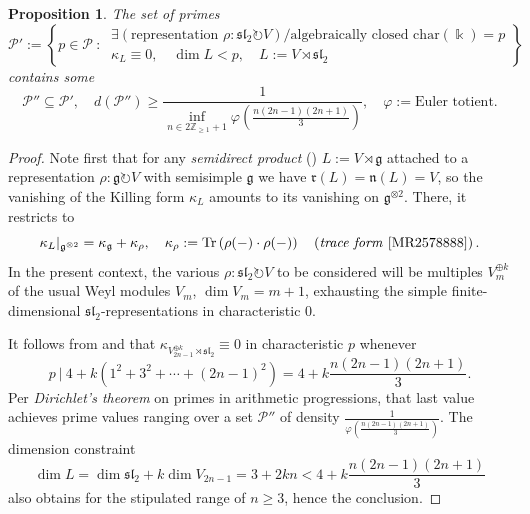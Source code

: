 \documentclass[11pt,leqno]{article}
\theoremstyle{plain}
\newtheorem{proposition}[lemma]{Proposition}
\theoremstyle{plain}
\theoremstyle{plain}
\numberwithin{equation}{section}
\theoremstyle{nonumberplain}
\newtheorem{proof}{Proof}
\newcommand\bZ{{\mathbb Z}}
\newcommand\cP{{\mathcal P}}
\newcommand\fg{{\mathfrak g}}
\newcommand\fn{{\mathfrak n}}
\newcommand\fr{{\mathfrak r}}
\newcommand\fsl{\mathfrak{sl}}
\newcommand\1{{\bf 1}}
\begin{document}
\begin{proposition}\label{pr:sl2.prime.dens}
  The set of primes
  \begin{equation*}
    \cP':=
    \left\{
      p\in \cP\ :\
      \begin{gathered}
        \exists\left(\text{representation }\rho:\fsl_2\circlearrowright V\right)/\text{algebraically closed $\mathrm{char}(\Bbbk)=p$}\\
        \kappa_L\equiv 0
        ,\quad
        \dim L < p
        ,\quad
        L:=V\rtimes \fsl_2
      \end{gathered}
    \right\}
  \end{equation*}
  contains some
  \begin{equation*}
    \cP''\subseteq \cP'
    ,\quad
    d\left(\cP''\right)
    \ge
    \frac 1{\inf_{n\in 2\bZ_{\ge 1}+1}\varphi\left(\frac{n(2n-1)(2n+1)}3\right)}
    ,\quad
    \varphi:=\text{Euler totient}.
  \end{equation*}
\end{proposition}
\begin{proof}
  Note first that for any \emph{semidirect product} (\cite[\S I.1.8, Example 2]{bourb_lie_1-3}) $L:=V\rtimes \fg$ attached to a representation $\rho:\fg\circlearrowright V$ with semisimple $\fg$ we have $\fr(L)=\fn(L)=V$, so the vanishing of the Killing form $\kappa_L$ amounts to its vanishing on ${\fg}^{\otimes 2}$. There, it restricts to
  \begin{equation}\label{eq:res.kill}
    \kappa_L|_{\fg^{\otimes 2}}
    =
    \kappa_{\fg}
    +\kappa_{\rho}
    ,\quad
    \kappa_{\rho}
    :=
    \mathrm{Tr}\left(\rho(-)\cdot \rho(-)\right)
    \quad
    \left(\text{\emph{trace form} \cite[p.543]{MR2578888}}\right).
  \end{equation}
  In the present context, the various $\rho:\fsl_2\circlearrowright V$ to be considered will be multiples $V_m^{\oplus k}$ of the usual \cite[\S 7.2, Theorem]{hmph_1972} Weyl modules $V_m$, $\dim V_m=m+1$, exhausting the simple finite-dimensional $\fsl_2$-representations in characteristic 0.
  
  It follows from \cite[Proposition 4.1]{MR2578888} and  that $\kappa_{V^{\oplus k}_{2n-1}\rtimes \fsl_2}\equiv 0$ in characteristic $p$ whenever 
  \begin{equation*}
    p\ |\ 4+k\left(1^2+3^2+\cdots+(2n-1)^2\right)
    =
    4+k\frac{n(2n-1)(2n+1)}3.
  \end{equation*}
  Per \emph{Dirichlet's theorem} \cite[\S VI.4.1, Theorem 2]{ser_arith_1973} on primes in arithmetic progressions, that last value achieves prime values ranging over a set $\cP''$ of density $\frac 1{\varphi\left(\frac{n(2n-1)(2n+1)}3\right)}$. The dimension constraint
\begin{equation*}
  \dim L=\dim \fsl_2+k\dim V_{2n-1}=3+2kn
  <
  4+k\frac{n(2n-1)(2n+1)}3
\end{equation*}
also obtains for the stipulated range of $n\ge 3$, hence the conclusion.
\end{proof}
\end{document}
